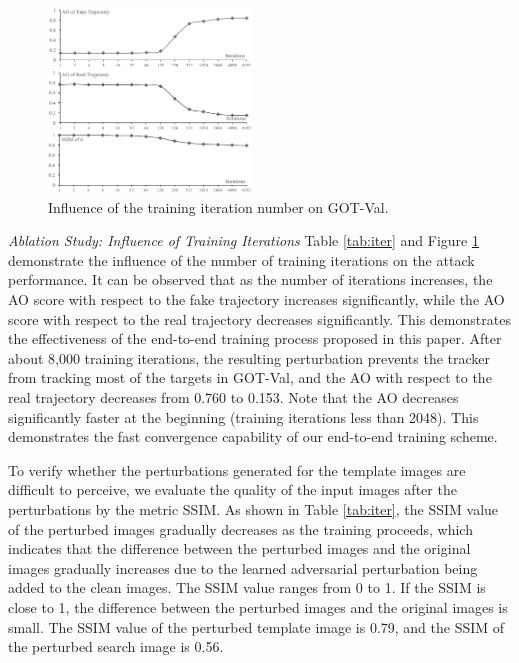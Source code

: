 \documentclass[journal]{IEEEtran}
\begin{document}
\begin{figure}[t]
  \centering
  \includegraphics[width=0.48\textwidth]{images_imperceptible/iter.png}
  \caption{Influence of the training iteration number on GOT-Val.} 
  \label{fig:iter}
\end{figure}

\textit{Ablation Study: Influence of Training Iterations} Table \ref{tab:iter} and Figure \ref{fig:iter} demonstrate the influence of the number of training iterations on the attack performance. It can be observed that as the number of iterations increases, the AO score with respect to the fake trajectory increases significantly, while the AO score with respect to the real trajectory decreases significantly. This demonstrates the effectiveness of the end-to-end training process proposed in this paper. After about 8,000 training iterations, the resulting perturbation prevents the tracker from tracking most of the targets in GOT-Val, and the AO with respect to the real trajectory decreases from 0.760 to 0.153. Note that the AO decreases significantly faster at the beginning (training iterations less than 2048). This demonstrates the fast convergence capability of our end-to-end training scheme.

To verify whether the perturbations generated for the template images are difficult to perceive, we evaluate the quality of the input images after the perturbations by the metric SSIM. As shown in Table \ref{tab:iter}, the SSIM value of the perturbed images gradually decreases as the training proceeds, which indicates that the difference between the perturbed images and the original images gradually increases due to the learned adversarial perturbation being added to the clean images. The SSIM value ranges from 0 to 1. If the SSIM is close to 1, the difference between the perturbed images and the original images is small. The SSIM value of the perturbed template image is 0.79, and the SSIM of the perturbed search image is 0.56.
\end{document}
